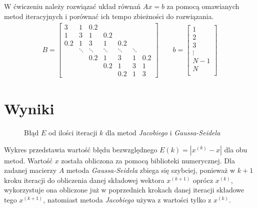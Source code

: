 \documentclass[11pt]{extarticle}
\begin{document}
	\pagebreak
	\subsection{}
	W ćwiczeniu należy rozwiązać układ równań \(Ax = b\) za pomocą omawianych metod iteracyjnych i porównać ich tempo zbieżności do rozwiązania.
	\begin{align}
		B = \begin{bmatrix}
									3		& 1		& 0.2 \\
							1 		& 3		& 1		& 0.2 \\
					0.2		& 1		& 3		& 1		& 0.2 \\
			& 		\ddots	&\ddots &\ddots &\ddots &\ddots \\
			&&		0.2		& 1		& 3		& 1		& 0.2 \\
			&&&		0.2		& 1		& 3		& 1	\\
			&&&&	0.2		& 1		& 3
		\end{bmatrix} \qquad
		b = \begin{bmatrix}
			1 \\
			2 \\
			3 \\
			\vdots \\
			N-1 \\
			N \\
		\end{bmatrix}
	\end{align}
	
	\section{Wyniki}
	\begin{figure}[H]
		\begin{center}
			
		\end{center}
		\caption{Błąd \(E\) od ilości iteracji \(k\) dla metod \textit{Jacobiego} i \textit{Gaussa-Seidela}}
	\end{figure}

	Wykres przedstawia wartość błędu bezwzględnego \(E(k) = |x^{(k)} - x|\) dla obu metod.
	Wartość \(x\) została obliczona za pomocą biblioteki numerycznej.
	Dla zadanej macierzy \(A\) metoda \textit{Gaussa-Seidela} zbiega się szybciej, ponieważ w \(k+1\) kroku iteracji do obliczenia danej składowej wektora \(x^{(k+1)}\) oprócz \(x^{(k)}\), wykorzystuje ona obliczone już w poprzednich krokach danej iteracji składowe tego \(x^{(k+1)}\), natomiast metoda \textit{Jacobiego} używa z wartości tylko z \(x^{(k)}\).
	
\end{document}
